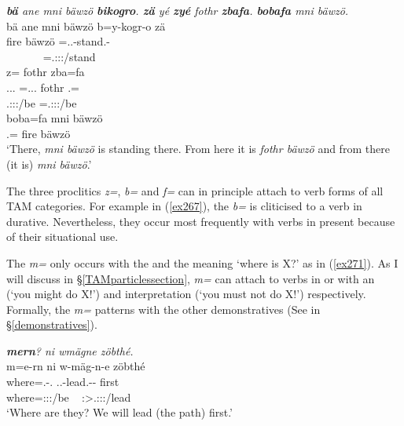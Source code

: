 \begin{exe}
	\ex \emph{\textbf{bä} ane mni bäwzö \textbf{bikogro}. \textbf{zä} yé \textbf{zyé} fothr \textbf{zbafa}. \textbf{bobafa} mni bäwzö.}\\
	\glll bä ane mni bäwzö b=y-kogr-o zä\\
	\Med{} \Dem{} fire bäwzö \Med=\Tsg.\Masc.\Alph-stand.\Ndu-\Andat{} \Prox{}\\
	~ ~ ~ ~ {\Med=\Tsg.\Masc:\Sbj:\Nonpast:\Ipfv/stand} ~\\
	\sn
	\glll {} z= fothr zba=fa\\
	\Tsg.\Masc.\Cop.\Ndu{} \Prox=\Tsg.\Masc.\Cop.\Ndu{} fothr \Prox.\Abl=\Abl{}\\
	\footnotesize{\Tsg.\Masc:\Sbj:\Nonpast:\Ipfv/be} \footnotesize{\Prox=\Tsg.\Masc:\Sbj:\Nonpast:\Ipfv/be} ~ ~ ~ ~ ~ ~\\
	\sn
	\gll boba=fa mni bäwzö\\
	\Med.\Abl=\Abl{} fire bäwzö\\
	\trans `There, \emph{mni bäwzö} is standing there. From here it is \emph{fothr bäwzö} and from there (it is) \emph{mni bäwzö}.' 
	\label{ex272}
\end{exe}

The three proclitics \emph{z=}, \emph{b=} and \emph{f=} can in principle attach to verb forms of all TAM categories. For example in (\ref{ex267}), the  \emph{b=} is cliticised to a verb in  durative. Nevertheless, they occur most frequently with verbs in present  because of their situational use.%

The  \emph{m=} only occurs with the  and the meaning `where is X?' as in (\ref{ex271}). As I will discuss in \S{}\ref{TAMparticlessection}, \emph{m=} can attach to verbs in  or   with an  (`you might do X!') and  interpretation (`you must not do X!') respectively. Formally, the \emph{m=}  patterns with the other demonstratives (See  in \S{}\ref{demonstratives}).

\begin{exe}
	\ex \emph{\textbf{mern}? ni wmägne zöbthé.}\\
	\glll m=e-rn ni w-mäg-n-e zöbthé\\
	where=\Stnsg.\Alph-\Cop.\Du{} \Fnsg{} \Tsg.\F.\Alph-lead.\Ext-\Du-\Fnsg{} first\\
	\footnotesize{where=\Stdu:\Sbj:\Nonpast:\Ipfv/be} ~ {\Fdu:\Sbj>\Tsg.\F:\Obj:\Nonpast:\Ipfv/lead} ~\\
	\trans `Where are they? We will lead (the path) first.' 
	\label{ex271}
\end{exe}